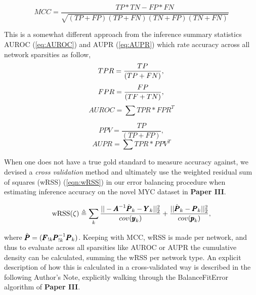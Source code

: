\begin{equation}\label{eq:MCC}
MCC=\frac{TP*TN-FP*FN}{\sqrt{(TP+FP)(TP+FN)(TN+FP)(TN+FN)}}
\end{equation}

This is a somewhat different approach from the inference summary statistics AUROC (\cref{eq:AUROC}) and AUPR (\cref{eq:AUPR}) which rate accuracy across all network sparsities as follow,
\begin{equation}\label{eq:TPR}
TPR=\frac{TP}{(TP+FN)},\\ \end{equation}
\begin{equation}\label{eq:FPR}
FPR=\frac{FP}{(TF+TN)},\\ \end{equation}
\begin{equation}\label{eq:AUROC}
AUROC=\sum{TPR*FPR^T}
\end{equation}

\begin{equation}\label{eq:PPV} 
PPV=\frac{TP}{(TP+FP)},\end{equation}
\begin{equation}\label{eq:AUPR}
AUPR=\sum{TPR*PPV^T}
\end{equation}


When one does not have a true gold standard to measure accuracy against, we devised a \emph{cross validation} method and ultimately use the weighted residual sum of squares (wRSS) (\cref{eqn:wRSS}) in our error balancing procedure when estimating inference accuracy on the novel MYC dataset in \textbf{Paper III}.

\begin{equation}\label{eqn:wRSS}
  \textrm{wRSS}(\zeta) \triangleq \sum_k \frac{||-{\pmb{A}}^{-1}\hat{{\pmb{P}}}_k-{\pmb{Y}}_k||^2_2}{cov({\pmb{y}}_k)}+\frac{||\hat{{\pmb{P}}}_k-{\pmb{P}}_k||^2_2}{cov({\pmb{p}}_k)},
\end{equation}

where $\hat{{\pmb{P}}}=({\pmb{F}}_{!k}{\pmb{P}}^{-1}_{!k}{\pmb{P}}_k)$. Keeping with MCC, wRSS is made per network, and thus to evaluate across all sparsities like AUROC or AUPR the cumulative density can be calculated, summing the wRSS per network type. An explicit description of how this is calculated in a cross-validated way is described in the following Author's Note, explicitly walking through the BalanceFitError algorithm of \textbf{Paper III}.\\

